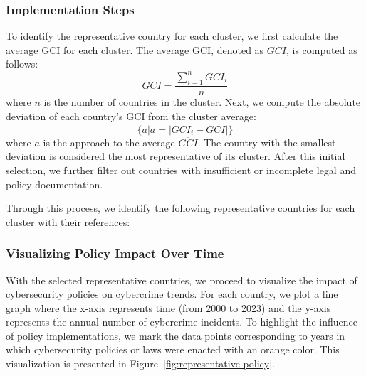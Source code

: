     \subsubsection*{Implementation Steps} %
        To identify the representative country for each cluster,
        we first calculate the average GCI for each cluster.
        The average GCI, denoted as \(\overline{GCI}\), is computed as follows:
        \begin{equation}
            \overline{GCI} = \frac{\sum_{i=1}^{n} GCI_i}{n}\label{eq:4-1-1-1}
        \end{equation}
        where \(n\) is the number of countries in the cluster.
        Next, we compute the absolute deviation of each country's GCI from the cluster average:
        \begin{equation}
            \{ a|a= |GCI_i - \overline{GCI}| \}\label{eq:4-1-1-2}
        \end{equation}
        where \(a\) is the approach to the average \( \overline{GCI} \).
        The country with the smallest deviation is considered the most representative of its cluster.
        After this initial selection, we further filter out countries with insufficient or incomplete legal and policy documentation.
    
        Through this process, we identify the following representative countries for each cluster with their references:
        \bigskip
        \begin{table}
            \centering
            \caption{Representative Countries of Each Tie Based on GCI Division}
            \label{tab:representative-countries-of-each-tie-based-on-gci-division}
        \end{table}

    \subsubsection*{Visualizing Policy Impact Over Time} %
        With the selected representative countries,
        we proceed to visualize the impact of cybersecurity policies on cybercrime trends.
        For each country, we plot a line graph where
        the x-axis represents time (from 2000 to 2023) and the y-axis represents the annual number of cybercrime incidents.
        To highlight the influence of policy implementations,
        we mark the data points corresponding to years in which cybersecurity policies or laws were enacted with an orange color.
        This visualization is presented in Figure~\ref{fig:representative-policy}.
    
